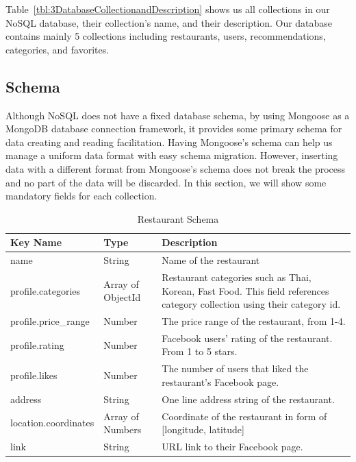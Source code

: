 \documentclass[12pt,oneside,openright,a4paper]{cpe-english-project}
\begin{document}
Table~\ref{tbl:3DatabaseCollectionandDescription} shows us all collections in our NoSQL database, their collection’s name, and their description. Our database contains mainly 5 collections including restaurants, users, recommendations, categories, and favorites.

\subsection{Schema}

Although NoSQL does not have a fixed database schema, by using Mongoose as a MongoDB database connection framework, it provides some primary schema for data creating and reading facilitation. Having Mongoose’s schema can help us manage a uniform data format with easy schema migration. However, inserting data with a different format from Mongoose’s schema does not break the process and no part of the data will be discarded. In this section, we will show some mandatory fields for each collection.


\begin{table}[H]
\caption{Restaurant Schema}\label{tbl:3RestaurantSchema}
\begin{tabularx}{\textwidth}{l|l|X} \hline\hline
Key Name & Type & Description \\ \hline\hline
name & String & Name of the restaurant \\ \hline
profile.categories & Array of ObjectId & Restaurant categories such as Thai, Korean, Fast Food. This field references category collection using their category id. \\ \hline
profile.price\_range & Number & The price range of the restaurant, from 1-4. \\ \hline
profile.rating & Number & Facebook users’ rating of the restaurant. From 1 to 5 stars. \\ \hline
profile.likes & Number & The number of users that liked the restaurant’s Facebook page. \\ \hline
address & String & One line address string of the restaurant. \\ \hline
location.coordinates & Array of Numbers & Coordinate of the restaurant in form of [longitude, latitude] \\ \hline
link & String & URL link to their Facebook page. \\ \hline\hline
\end{tabularx}
\end{table}
\end{document}
